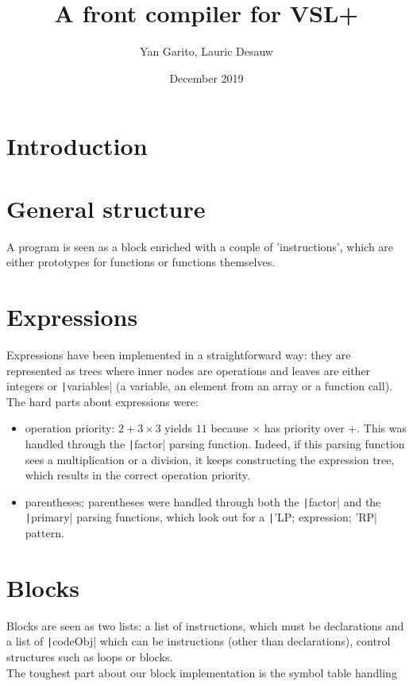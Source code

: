 \documentclass{article}
\title{A front compiler for VSL+}
\author{Yan Garito, Lauric Desauw}
\date{December 2019}
\newcommand{\code}[1]{\texttt|#1|}
\begin{document}
\maketitle

\section{Introduction}
\section{General structure}

A program is seen as a block enriched with a couple of 'instructions', which are either prototypes for functions or functions themselves.

\section{Expressions}

Expressions have been implemented in a straightforward way: they are represented as trees where inner nodes are operations and leaves are either integers or \code{variables} (a variable, an element from an array or a function call). \\
The hard parts about expressions were:
\begin{itemize}

\item operation priority: $2+3 \times 3$ yields $11$ because $\times$ has priority over $+$. This was handled through the \code{factor} parsing function. Indeed, if this parsing function sees a multiplication or a division, it keeps constructing the expression tree, which results in the correct operation priority.
\item parentheses: parentheses were handled through both the \code{factor} and the \code{primary} parsing functions, which look out for a \code{'LP; expression; 'RP} pattern. 
  
\end{itemize}
  
\section{Blocks}

Blocks are seen as two lists: a list of instructions, which must be declarations and a list of \code{codeObj} which can be instructions (other than declarations), control structures such as loops or blocks. \\
The toughest part about our block implementation is the symbol table handling \TODO
\end{document}
